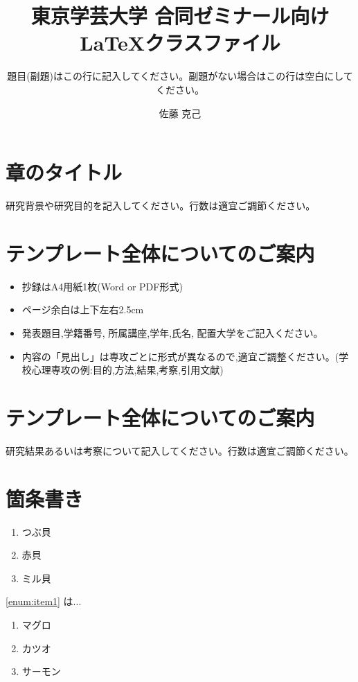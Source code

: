 \documentclass[dvipdfmx]{gakugei-doctoral-course-joint-seminar}
\title{東京学芸大学 合同ゼミナール向け \LaTeX クラスファイル}
\subtitle{題目(副題)はこの行に記入してください。副題がない場合はこの行は空白にしてください。}
\affiliation{$\circ\circ$大学 $\circ\circ$ 講座}
\author{佐藤 克己}
\begin{document}

\maketitle

\section*{章のタイトル}

研究背景や研究目的を記入してください。行数は適宜ご調節ください。

\section*{テンプレート全体についてのご案内}

\begin{itemize}
	\item 抄録はA4用紙1枚(Word or PDF形式)
	\item ページ余白は上下左右2.5cm
	\item 発表題目,学籍番号, 所属講座,学年,氏名, 配置大学をご記入ください。
	\item 内容の「見出し」は専攻ごとに形式が異なるので,適宜ご調整ください。(学校心理専攻の例:目的,方法,結果,考察,引用文献)
\end{itemize}

\section*{テンプレート全体についてのご案内}

研究結果あるいは考察について記入してください。行数は適宜ご調節ください。

\section{箇条書き}

\begin{enumerate}[labelindent=1\parindent,leftmargin=*,label=第\arabic{enumi}位.,ref=\arabic{enumi}]
		\item つぶ貝\label{enum:item1}
		\item 赤貝\label{enum:item2}
		\item ミル貝\label{enum:item3}
\end{enumerate}

\ref{enum:item1} は...

\begin{enumerate}[labelindent=2\parindent,leftmargin=*,label=第\arabic{enumi}位.,ref=お寿司 その\arabic{enumi}]
		\item マグロ\label{enum:item4}
		\item カツオ\label{enum:item5}
		\item サーモン\label{enum:item6}
\end{enumerate}
\end{document}
